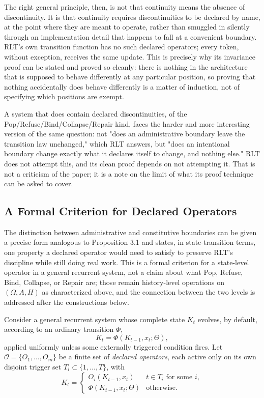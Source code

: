 \documentclass[11pt]{article}
\begin{document}
The right general principle, then, is not that continuity means the absence of discontinuity. It is that continuity requires discontinuities to be declared by name, at the point where they are meant to operate, rather than smuggled in silently through an implementation detail that happens to fall at a convenient boundary. RLT's own transition function has no such declared operators; every token, without exception, receives the same update. This is precisely why its invariance proof can be stated and proved so cleanly: there is nothing in the architecture that is supposed to behave differently at any particular position, so proving that nothing accidentally does behave differently is a matter of induction, not of specifying which positions are exempt.

A system that does contain declared discontinuities, of the Pop/Refuse/Bind/Collapse/Repair kind, faces the harder and more interesting version of the same question: not "does an administrative boundary leave the transition law unchanged," which RLT answers, but "does an intentional boundary change exactly what it declares itself to change, and nothing else." RLT does not attempt this, and its clean proof depends on not attempting it. That is not a criticism of the paper; it is a note on the limit of what its proof technique can be asked to cover.

\subsection{A Formal Criterion for Declared Operators}

The distinction between administrative and constitutive boundaries can be given a precise form analogous to Proposition 3.1 and states, in state-transition terms, one property a declared operator would need to satisfy to preserve RLT's discipline while still doing real work. This is a formal criterion for a state-level operator in a general recurrent system, not a claim about what Pop, Refuse, Bind, Collapse, or Repair are; those remain history-level operations on $(\Omega, A, H)$ as characterized above, and the connection between the two levels is addressed after the constructions below.

Consider a general recurrent system whose complete state $K_t$ evolves, by default, according to an ordinary transition $\Phi$,
\[
K_t = \Phi(K_{t-1}, x_t; \Theta),
\]
applied uniformly unless some externally triggered condition fires. Let $\mathcal O = \{O_1, \ldots, O_m\}$ be a finite set of \emph{declared operators}, each active only on its own disjoint trigger set $T_i \subset \{1, \ldots, T\}$, with
\[
K_t =
\begin{cases}
O_i(K_{t-1}, x_t) & t \in T_i \text{ for some } i, \\[2pt]
\Phi(K_{t-1}, x_t; \Theta) & \text{otherwise.}
\end{cases}
\]
\end{document}
